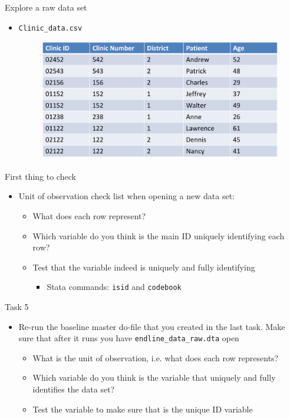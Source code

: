 \documentclass[aspectratio=169]{beamer}
\begin{document}
\begin{frame}{Explore a raw data set}
	\begin{itemize}
		\item \texttt{Clinic\_data.csv}
		\begin{figure}
			\centering
			\includegraphics[width=\linewidth]{img/raw2}
		\end{figure}
	\end{itemize}
\end{frame}


\begin{frame}{First thing to check}
	\begin{itemize}
		\item Unit of observation check list when opening a new data set:
		\begin{itemize}
			\item What does each row represent?
			\item Which variable do you think is the main ID uniquely identifying each row?
			\item Test that the variable indeed is uniquely and fully identifying
			\begin{itemize}
				\item Stata commands: \texttt{isid} and \texttt{codebook}
			\end{itemize}
		\end{itemize}
	\end{itemize}
\end{frame}


\begin{frame}{Task 5}
	\begin{itemize}
		\item Re-run the baseline master do-file that you created in the last task. Make sure that after it runs you have  \texttt{endline\_data\_raw.dta} open
		\begin{itemize}
			\item What is the unit of observation, i.e. what does each row represents?
			\item Which variable do you think is the variable that uniquely and fully identifies the data set?
			\item Test the variable to make sure that is the unique ID variable
		\end{itemize}
	\end{itemize}
\end{frame}
\end{document}

